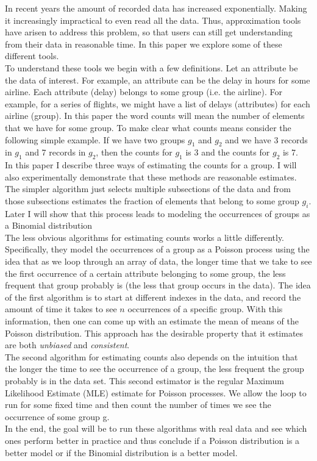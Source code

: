 \documentclass[a4paper]{article}
\begin{document}
In recent years the amount of recorded data has increased exponentially.
Making it increasingly impractical to even read all the data.
Thus, approximation tools have arisen to address this problem, so that users can still get understanding from their data in reasonable time.
In this paper we explore some of these different tools.\\
\indent To understand these tools we begin with a few definitions.
Let an attribute be the data of interest.
For example, an attribute can be the delay in hours for some airline.
Each attribute (delay) belongs to some group (i.e. the airline).
For example, for a series of flights, we might have a list of delays (attributes) for each airline (group).
In this paper the word counts will mean the number of elements that we have for some group.
To make clear what counts means consider the following simple example.
If we have two groups $g_1$ and $g_2$ and we have 3 records in $g_1$ and 7 records in $g_2$, then the counts for $g_1$ is 3 and the counts for $g_2$ is 7.\\
\indent In this paper I describe three ways of estimating the counts for a group.
I will also experimentally demonstrate that these methods are reasonable estimates.
The simpler algorithm just selects multiple subsections of the data and from those subsections estimates the fraction of elements that belong to some group $g_i$. Later I will show that this process leads to modeling the occurrences of groups as a Binomial distribution\\
\indent The less obvious algorithms for estimating counts works a little differently.
Specifically, they model the occurrences of a group as a Poisson process using the idea that as we loop through an array of data, the longer time that we take to see the first occurrence of a certain attribute belonging to some group, the less frequent that group probably is (the less that group occurs in the data).
The idea of the first algorithm is to start at different indexes in the data, and record the amount of time it takes to see $n$ occurrences of a specific group.
With this information, then one can come up with an estimate the mean of means of the Poisson distribution.
This approach has the desirable property that it estimates are both {\it unbiased} and {\it consistent}.\\
\indent The second algorithm for estimating counts also depends on the intuition that the longer the time to see the occurrence of a group, the less frequent the group probably is in the data set.
This second estimator is the regular Maximum Likelihood Estimate (MLE) estimate for Poisson processes.
We allow the loop to run for some fixed time and then count the number of times we see the occurrence of some group g. \\
\indent In the end, the goal will be to run these algorithms with real data and see which ones perform better in practice and thus conclude if a Poisson distribution is a better model or if the Binomial distribution is a better model.
\end{document}
